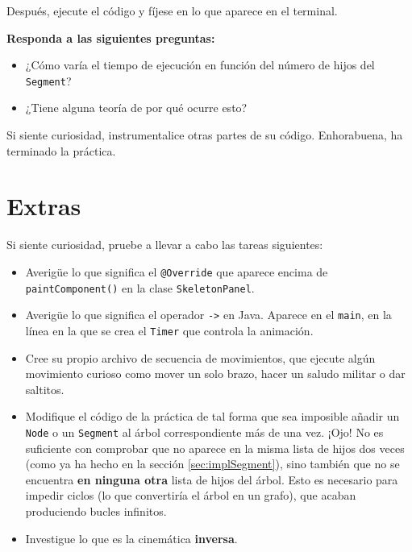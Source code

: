 \documentclass[10pt,a4paper,spanish]{article}
\newcommand{\code}[1]{\texttt{#1}}
\begin{document}
Después, ejecute el código y fíjese en lo que aparece en el terminal.

\textbf{Responda a las siguientes preguntas:}

\begin{itemize}
    \item ¿Cómo varía el tiempo de ejecución en función del número de hijos del \code{Segment}?
    \item ¿Tiene alguna teoría de por qué ocurre esto?
\end{itemize}

Si siente curiosidad, instrumentalice otras partes de su código. Enhorabuena, ha terminado la práctica.

\section{Extras}

Si siente curiosidad, pruebe a llevar a cabo las tareas siguientes:

\begin{itemize}
    \item Averigüe lo que significa el \code{@Override} que aparece encima de \code{paintComponent()} en la clase \code{SkeletonPanel}.
    \item Averigüe lo que significa el operador \code{->} en Java. Aparece en el \code{main}, en la línea en la que se crea el \code{Timer} que controla la animación.
    \item Cree su propio archivo de secuencia de movimientos, que ejecute algún movimiento curioso como mover un solo brazo, hacer un saludo militar o dar saltitos.
    \item Modifique el código de la práctica de tal forma que sea imposible añadir un \code{Node} o un \code{Segment} al árbol correspondiente más de una vez. ¡Ojo! No es suficiente con comprobar que no aparece en la misma lista de hijos dos veces (como ya ha hecho en la sección \ref{sec:implSegment}), sino también que no se encuentra \textbf{en ninguna otra} lista de hijos del árbol. Esto es necesario para impedir ciclos (lo que convertiría el árbol en un grafo), que acaban produciendo bucles infinitos.
    \item Investigue lo que es la cinemática \textbf{inversa}.
\end{itemize}
\end{document}
